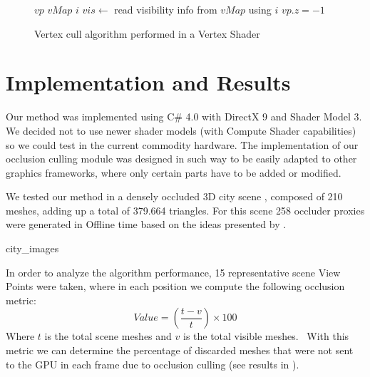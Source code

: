 \documentclass[10pt, conference]{IEEEtran}
\begin{document}
\begin{figure}[!hbp]
	
	\begin{algorithmic}[1]
		\REQUIRE $vp$ 
		\REQUIRE $vMap$ 
		\REQUIRE $i$ 
		\STATE $vis \leftarrow$ read visibility info from $vMap$ using $i$
			\STATE {}
		\ELSE
			\STATE $vp.z = -1$ 
		\ENDIF
	\end{algorithmic}
	\caption{Vertex cull algorithm performed in a Vertex Shader}
	\label{alg:vertex_shader}
\end{figure}





\section{Implementation and Results}
%
Our method was implemented using C\# 4.0 with DirectX 9 and Shader Model 3. 
We decided not to use newer shader models (with Compute Shader capabilities) so we could test in the current commodity hardware. 
The implementation of our occlusion culling module was designed in such way to be easily adapted to other graphics frameworks, where only certain parts have to be added or modified.\

We tested our method in a densely occluded 3D city scene , composed of 210 meshes, adding up a total of 379.664 triangles. 
For this scene 258 occluder proxies were generated in Offline time based on the ideas presented by \cite{cacic_occlusion_1}. 

{city_images}{
%
}




In order to analyze the algorithm performance, 15 representative scene View Points were taken, where in each position we compute the following 
occlusion metric:
\[
	Value = (\frac{t - v}{t}) \times 100
\]
Where $t$ is the total scene meshes and $v$ is the total visible meshes. \
With this metric we can determine the percentage of discarded meshes that were not sent to the GPU in each frame due to occlusion culling (see results in ).\
\end{document}
